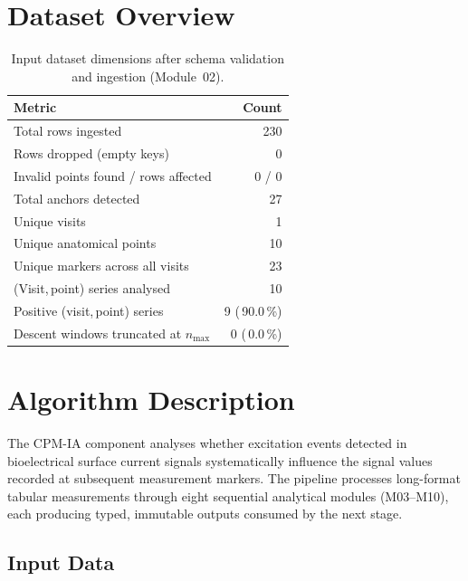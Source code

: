 \documentclass[a4paper,11pt]{article}
\begin{document}
\section{Dataset Overview}

\begin{table}[h!]
\centering
\small
\caption{Input dataset dimensions after schema validation and ingestion (Module~02).}
\begin{tabular}{lr}
\toprule
\textbf{Metric} & \textbf{Count} \\
\midrule
Total rows ingested                        & 230 \\
Rows dropped (empty keys)                  & 0 \\
Invalid points found / rows affected       & 0 / 0 \\
Total anchors detected                     & 27 \\
Unique visits                          & 1 \\
Unique anatomical points               & 10 \\
Unique markers across all visits       & 23 \\
(Visit,\,point) series analysed        & 10 \\
Positive (visit,\,point) series        & 9 (\,90.0\,\%) \\
Descent windows truncated at $n_{\max}$ & 0 (\,0.0\,\%) \\
\bottomrule
\end{tabular}
\end{table}

\section{Algorithm Description}

The CPM-IA component analyses whether excitation events detected in bioelectrical surface
current signals systematically influence the signal values recorded at subsequent measurement
markers. The pipeline processes long-format tabular measurements through eight sequential
analytical modules (M03--M10), each producing typed, immutable outputs consumed by the next
stage.

\subsection{Input Data}
\end{document}
